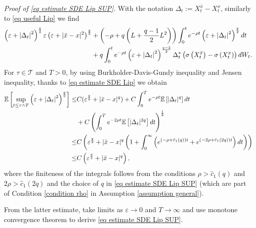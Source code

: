 \documentclass[11pt]{amsart}
\theoremstyle{plain}
\def \dd{{\rm d}}
\numberwithin{equation}{section}
\begin{document}
\smallbreak\noindent
\emph{Proof of \eqref{eq estimate SDE Lip SUP}.}
With the notation $\Delta_{t}:=X_{t}^{\bar{x}}-X_{t}^{x}$, 
similarly to \eqref{eq useful Lip} we find
$$
\begin{aligned}
\left(\varepsilon+\left|\Delta_{t}\right|^{2}\right)^{\frac{q}{2}} \varepsilon\left(\varepsilon+|\bar{x}-x|^{2}\right)^{\frac{q}{2}} & +\left(-\rho+q\left(L+\frac{q-1}{2} L^{2}\right)\right) \int_{0}^{t} e^{-\rho t}\left(\varepsilon+\left|\Delta_{t}\right|^{2}\right)^{\frac{q}{2}} \dd t \\
& +q \int_{0}^{t} e^{-\rho t}\left(\varepsilon+\left|\Delta_{t}\right|^{2}\right)^{\frac{q-2}{2}} \Delta_{t}^{*}\left(\sigma\left(X_{t}^{\bar{x}}\right)-\sigma\left(X_{t}^{x}\right)\right) \dd W_{t}.
\end{aligned}
$$
For $\tau \in \mathcal T$ and $T >0$, by using Burkholder-Davis-Gundy inequality  and Jensen inequality, thanks to \eqref{eq estimate SDE Lip} we obtain
$$
\begin{aligned}
\mathbb{E}\left[\sup _{t \leq \tau \land T}\left(\varepsilon+\left|\Delta_{t}\right|^{2}\right)^{\frac{q}{2}}\right] 
\leq& 
C (\varepsilon^{\frac q 2}+|\bar{x}-x|^{q}) +C \int_{0}^{T} e^{-\rho t} \mathbb{E}\left[|\Delta_t|^{q} \right] \dd t \\
& +C\left(\int_{0}^{T} e^{-2 \rho t } \mathbb{E}\left[  |\Delta _t|^{2 q} \right] \dd t\right)^{\frac{1}{2}} \\
 \leq& C \left( \varepsilon^{\frac q 2} + |\bar{x}-x|^{q} \left( 1 + \int_0^\infty \left(  e^{(-\rho + \hat c_1(q) )t} +  e^{(-2\rho + \hat c_1(2q) )t}\right) \dd t \right) \right) \\
 \leq & C \left( \varepsilon^{\frac q 2} + |\bar{x}-x|^{q}\right),
\end{aligned}
$$
where the finiteness of the integrals follows from the conditions $\rho > \hat c _1(q)$ and $2 \rho > \hat c _1 (2q)$ and the choice of $q$ in \eqref{eq estimate SDE Lip SUP} (which are part of Condition \ref{condition rho} in Assumption \ref{assumption general}).

From the latter estimate, take limits as $\varepsilon \to 0$ and $T \to \infty$ and use monotone convergence theorem to derive  \eqref{eq estimate SDE Lip SUP}.
\end{document}
